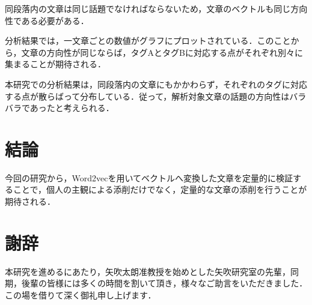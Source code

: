 同段落内の文章は同じ話題でなければならないため，文章のベクトルも同じ方向性である必要がある．

分析結果では，一文章ごとの数値がグラフにプロットされている．このことから，文章の方向性が同じならば，タグAとタグBに対応する点がそれぞれ別々に集まることが期待される．

本研究での分析結果は，同段落内の文章にもかかわらず，それぞれのタグに対応する点が散らばって分布している．従って，解析対象文章の話題の方向性はバラバラであったと考えられる．

\chapter{結論}
今回の研究から，Word2vecを用いてベクトルへ変換した文章を定量的に検証することで，個人の主観による添削だけでなく，定量的な文章の添削を行うことが期待される．

\nocite{01}
\nocite{02}
\nocite{03}
\nocite{04}


\chapter*{謝辞}
本研究を進めるにあたり，矢吹太朗准教授を始めとした矢吹研究室の先輩，同期，後輩の皆様には多くの時間を割いて頂き，様々なご助言をいただきました．この場を借りて深く御礼申し上げます．



